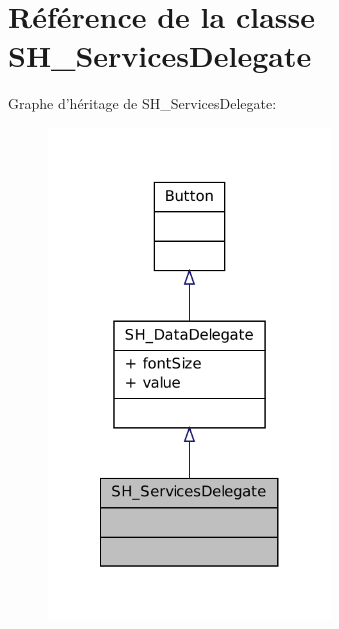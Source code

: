 \hypertarget{classSH__ServicesDelegate}{\section{Référence de la classe S\-H\-\_\-\-Services\-Delegate}
\label{classSH__ServicesDelegate}
}


Graphe d'héritage de S\-H\-\_\-\-Services\-Delegate\-:
\nopagebreak
\begin{figure}[H]
\begin{center}
\leavevmode
\includegraphics[width=212pt]{classSH__ServicesDelegate__inherit__graph}
\end{center}
\end{figure}


